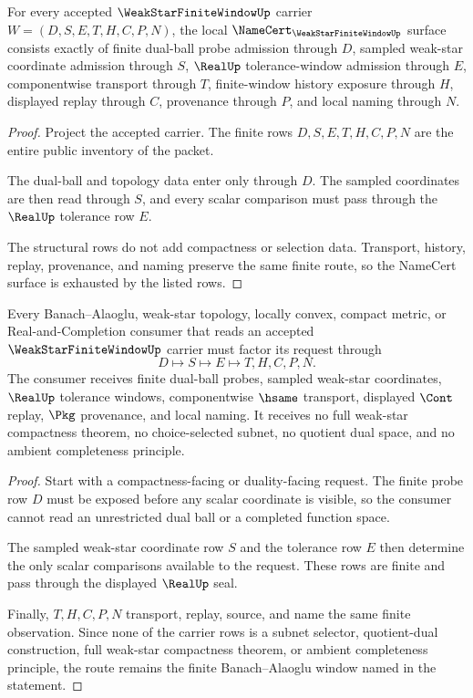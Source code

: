\begin{theorem}
\label{thm:weak-star-finite-window-namecert-obligations}
For every accepted $\WeakStarFiniteWindowUp$ carrier $W=(D,S,E,T,H,C,P,N)$, the local $\NameCert_{\WeakStarFiniteWindowUp}$ surface consists exactly of finite dual-ball probe admission through $D$, sampled weak-star coordinate admission through $S$, $\RealUp$ tolerance-window admission through $E$, componentwise transport through $T$, finite-window history exposure through $H$, displayed replay through $C$, provenance through $P$, and local naming through $N$.
\end{theorem}
\begin{proof}
Project the accepted carrier. The finite rows $D,S,E,T,H,C,P,N$ are the entire public inventory of the packet.

The dual-ball and topology data enter only through $D$. The sampled coordinates are then read through $S$, and every scalar comparison must pass through the $\RealUp$ tolerance row $E$.

The structural rows do not add compactness or selection data. Transport, history, replay, provenance, and naming preserve the same finite route, so the NameCert surface is exhausted by the listed rows.
\end{proof}

\begin{theorem}
\label{thm:weak-star-finite-window-banach-alaoglu-route}
Every Banach--Alaoglu, weak-star topology, locally convex, compact metric, or Real-and-Completion consumer that reads an accepted $\WeakStarFiniteWindowUp$ carrier must factor its request through
$$
D \longmapsto S \longmapsto E \longmapsto T,H,C,P,N .
$$
The consumer receives finite dual-ball probes, sampled weak-star coordinates, $\RealUp$ tolerance windows, componentwise $\hsame$ transport, displayed $\Cont$ replay, $\Pkg$ provenance, and local naming. It receives no full weak-star compactness theorem, no choice-selected subnet, no quotient dual space, and no ambient completeness principle.
\end{theorem}
\begin{proof}
Start with a compactness-facing or duality-facing request. The finite probe row $D$ must be exposed before any scalar coordinate is visible, so the consumer cannot read an unrestricted dual ball or a completed function space.

The sampled weak-star coordinate row $S$ and the tolerance row $E$ then determine the only scalar comparisons available to the request. These rows are finite and pass through the displayed $\RealUp$ seal.

Finally, $T,H,C,P,N$ transport, replay, source, and name the same finite observation. Since none of the carrier rows is a subnet selector, quotient-dual construction, full weak-star compactness theorem, or ambient completeness principle, the route remains the finite Banach--Alaoglu window named in the statement.
\end{proof}

